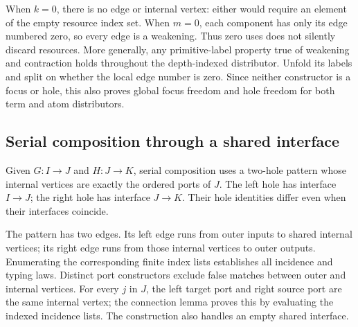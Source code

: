 

When $k=0$, there is no edge or internal vertex: either would require an
element of the empty resource index set. When $m=0$, each component has only
its edge numbered zero, so every edge is a weakening. Thus zero uses does
not silently discard resources. More generally, any primitive-label property
true of weakening and contraction holds throughout the depth-indexed
distributor. Unfold its labels and split on whether the local edge number
is zero. Since neither constructor is a focus or hole, this also proves
global focus freedom and hole freedom for both term and atom distributors.







\subsection{Serial composition through a shared interface}
Given $G:I\to J$ and $H:J\to K$, serial composition uses a two-hole pattern
whose internal vertices are exactly the ordered ports of $J$. The left hole
has interface $I\to J$; the right hole has interface $J\to K$. Their hole
identities differ even when their interfaces coincide.

The pattern has two edges. Its left edge runs from outer inputs to shared
internal vertices; its right edge runs from those internal vertices to outer
outputs. Enumerating the corresponding finite index lists establishes all
incidence and typing laws. Distinct port constructors exclude false matches
between outer and internal vertices. For every $j$ in $J$, the left target
port and right source port are the same internal vertex; the connection
lemma proves this by evaluating the indexed incidence lists. The construction
also handles an empty shared interface.

